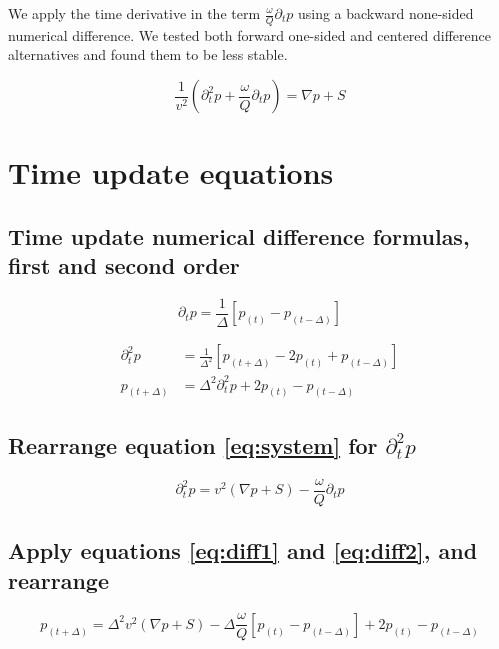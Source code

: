 \documentclass[10pt,fleqn]{article}
\begin{document}
We apply the time derivative in the term $\displaystyle \frac{\omega}{Q} \partial_t p$
using a backward none-sided numerical difference. We tested both forward one-sided
and centered difference alternatives and found them to be less stable.

\begin{equation}
\frac{1}{v^2} \left( \partial_t^2 p + \frac{\omega}{Q} \partial_t p \right) = \nabla p + S
\label{eq:system}
\end{equation}

\newpage
\section{Time update equations}

\subsection{Time update numerical difference formulas, first and second order}
\begin{equation}
\partial_t p = \frac{1}{\Delta} \left[ p_{(t)} - p_{(t - \Delta)} \right]
\label{eq:diff1}
\end{equation}

\begin{equation}
\begin{aligned}
\partial_t^2 p &= \frac{1}{\Delta^2} \left[ p_{(t+\Delta)} - 2 p_{(t)} + p_{(t - \Delta)} \right] \\[10pt]
p_{(t+\Delta)} &= \Delta^2 \partial_t^2 p + 2 p_{(t)} - p_{(t - \Delta)}
\end{aligned}
\label{eq:diff2}
\end{equation}

\subsection{Rearrange equation \ref{eq:system} for $\partial_t^2 p$}
\begin{equation}
\partial_t^2 p = v^2 \left( \nabla p + S \right) - \frac{\omega}{Q} \partial_t p 
\end{equation}

\subsection{Apply equations \ref{eq:diff1} and \ref{eq:diff2}, and rearrange}
\begin{equation}
p_{(t+\Delta)} = \Delta^2 v^2 \left( \nabla p + S \right) - \Delta \frac{\omega}{Q} \left[ p_{(t)} - p_{(t - \Delta)} \right] 
+ 2 p_{(t)} - p_{(t - \Delta)} 
\end{equation}
\end{document}
